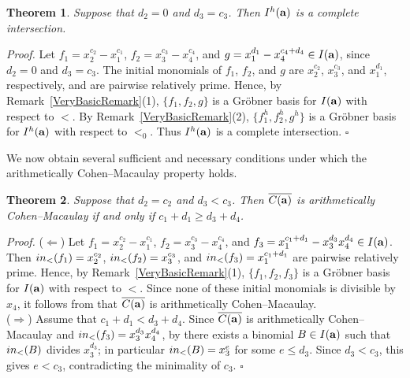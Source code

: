 \documentclass[10pt,a4paper]{amsart}
\newtheorem{thm1}{Theorem}[section]
\begin{document}
\begin{thm1} \label{CI23} Suppose that $d_2=0$ and $d_{3}=c_{3}$. Then $I^{h}({\bf a})$ is a complete intersection.
\end{thm1}
{\em \noindent Proof.} Let
$f_1=x_2^{c_2}-x_1^{c_1}$,
$f_2=x_3^{c_3}-x_4^{c_4}$,
and
$g=x_1^{d_1}-x_4^{c_4+d_4}\in I({\bf a})$,
since $d_2=0$ and $d_3=c_3$.
The initial monomials of $f_1$, $f_2$, and $g$ are
$x_2^{c_2}$,
$x_3^{c_3}$,
and
$x_1^{d_1}$,
respectively, and are pairwise relatively prime.
Hence, by Remark~\ref{VeryBasicRemark}(1),
$\{f_1,f_2,g\}$ is a Gr\"obner basis for $I({\bf a})$ with respect to $<$.
By Remark~\ref{VeryBasicRemark}(2),
$\{f_1^{h},f_2^{h},g^{h}\}$ is a Gr\"obner basis for $I^{h}({\bf a})$
with respect to $<_0$.
Thus $I^{h}({\bf a})$ is a complete intersection.
\hfill $\square$ \par\vspace{0.5\baselineskip}

We now obtain several sufficient and necessary conditions under which the arithmetically Cohen--Macaulay property holds.

\begin{thm1} \label{ACM1} Suppose that $d_2=c_2$ and $d_3<c_3$. Then $\overline{C({\bf a})}$ is arithmetically Cohen--Macaulay if and only if $c_{1}+d_{1} \geq d_{3}+d_{4}$.
\end{thm1}

{\em \noindent Proof.} ($\Leftarrow$) Let $f_{1}=x_2^{c_2}-x_1^{c_1}$, $f_{2}=x_3^{c_3}-x_4^{c_4}$, and $f_{3}=x_1^{c_1+d_{1}}-x_3^{d_3}x_4^{d_4}\in I({\bf a})$. Then ${\rm in}_{<}(f_{1})=x_2^{c_2}$, ${\rm in}_{<}(f_{2})=x_3^{c_3}$, and ${\rm in}_{<}(f_{3})=x_1^{c_1+d_1}$ are pairwise relatively prime. Hence, by Remark~\ref{VeryBasicRemark}(1), $\{f_1,f_2,f_3\}$ is a Gr\"obner basis for $I({\bf a})$ with respect to $<$. Since none of these initial monomials is divisible by $x_4$, it follows from \cite[Theorem~2.2]{HerSta} that $\overline{C({\bf a})}$ is arithmetically Cohen--Macaulay.\\
($\Rightarrow$) Assume that $c_{1}+d_{1}<d_{3}+d_{4}$. Since $\overline{C({\bf a})}$ is arithmetically Cohen--Macaulay and ${\rm in}_{<}(f_{3})=x_3^{d_{3}}x_4^{d_4}$, by \cite[Theorem 2.2]{HerSta} there exists a binomial $B \in I({\bf a})$ such that ${\rm in}_{<}(B)$ divides $x_3^{d_3}$; in particular ${\rm in}_{<}(B)=x_{3}^{e}$ for some $e \leq d_3$. Since $d_3<c_3$, this gives $e<c_3$, contradicting the minimality of $c_3$. \hfill $\square$ \par\vspace{0.5\baselineskip}
\end{document}
